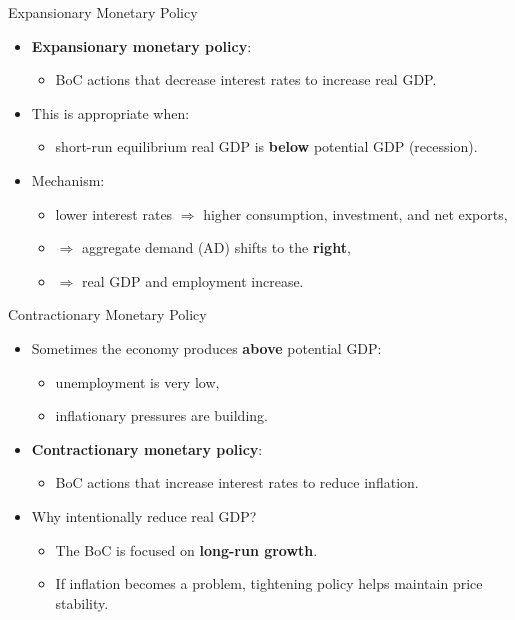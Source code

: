 \documentclass[aspectratio=169]{beamer}
\begin{document}
\begin{frame}{Expansionary Monetary Policy}
\transfade
\begin{itemize}
  \item \textbf{Expansionary monetary policy}:
  \begin{itemize}
    \item BoC actions that \alert{decrease} interest rates to \alert{increase} real GDP.
  \end{itemize}
  \item This is appropriate when:
  \begin{itemize}
    \item short-run equilibrium real GDP is \textbf{below} potential GDP (recession).
  \end{itemize}
  \item Mechanism:
  \begin{itemize}
    \item lower interest rates \(\Rightarrow\) higher consumption, investment, and net exports,
    \item \(\Rightarrow\) aggregate demand (AD) shifts to the \textbf{right},
    \item \(\Rightarrow\) real GDP and employment increase.
  \end{itemize}
\end{itemize}
\end{frame}



\begin{frame}{Contractionary Monetary Policy}
\transfade
\begin{itemize}
  \item Sometimes the economy produces \textbf{above} potential GDP:
  \begin{itemize}
    \item unemployment is very low,
    \item inflationary pressures are building.
  \end{itemize}
  \item \textbf{Contractionary monetary policy}:
  \begin{itemize}
    \item BoC actions that \alert{increase} interest rates to \alert{reduce} inflation.
  \end{itemize}
  \item Why intentionally reduce real GDP?
  \begin{itemize}
    \item The BoC is focused on \textbf{long-run growth}.
    \item If inflation becomes a problem, tightening policy helps maintain \alert{price stability}.
  \end{itemize}
\end{itemize}
\end{frame}
\end{document}
